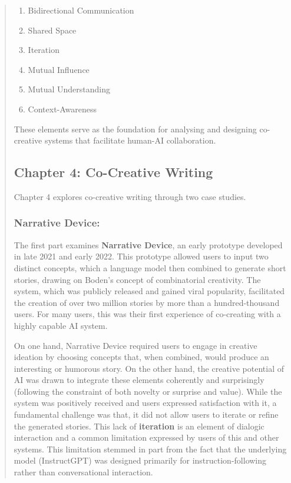 \begin{quote}
\begin{enumerate}[label=\arabic*.]
    \item Bidirectional Communication
    \item Shared Space
    \item Iteration
    \item Mutual Influence
    \item Mutual Understanding
    \item Context-Awareness
\end{enumerate}

These elements serve as the foundation for analysing and designing co-creative systems that facilitate human-AI collaboration.

\subsection*{Chapter 4: Co-Creative Writing}

Chapter 4 explores co-creative writing through two case studies. 

\subsubsection{Narrative Device: } The first part examines \textbf{Narrative Device}, an early prototype developed in late 2021 and early 2022. This prototype allowed users to input two distinct concepts, which a language model then combined to generate short stories, drawing on Boden’s concept of combinatorial creativity. The system, which was publicly released and gained viral popularity, facilitated the creation of over two million stories by more than a hundred-thousand users. For many users, this was their first experience of co-creating with a highly capable AI system.

On one hand, Narrative Device required users to engage in creative ideation by choosing concepts that, when combined, would produce an interesting or humorous story. On the other hand, the creative potential of AI was drawn to integrate these elements coherently and surprisingly (following the constraint of both novelty or surprise and value). While the system was positively received and users expressed satisfaction with it, a fundamental challenge was that, it did not allow users to iterate or refine the generated stories. This lack of \textbf{iteration} is an element of dialogic interaction and a common limitation expressed by users of this and other systems. This limitation stemmed in part from the fact that the underlying model (InstructGPT) was designed primarily for instruction-following rather than conversational interaction.


\end{quote}
